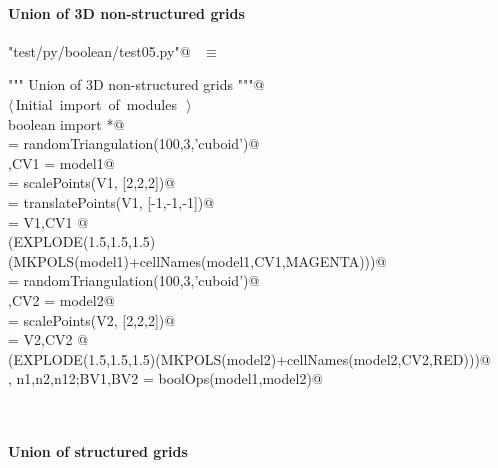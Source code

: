 \documentclass[11pt,oneside]{article}	%
\begin{document}
\paragraph{Union of 3D non-structured grids}

\begin{flushleft} \small
\begin{minipage}{\linewidth} \label{scrap23}
\verb@"test/py/boolean/test05.py"@\nobreak\ {\footnotesize {} }$\equiv$
\vspace{-1ex}
\begin{list}{}{} \item
\mbox{}\verb@""" Union of 3D non-structured grids """@\\
\mbox{}\verb@@\hbox{$\langle\,$Initial import of modules\nobreak\ {\footnotesize {}}$\,\rangle$}\verb@@\\
\mbox{}\verb@from boolean import *@\\
\mbox{} = randomTriangulation(100,3,'cuboid')@\\
\mbox{},CV1 = model1@\\
\mbox{} = scalePoints(V1, [2,2,2])@\\
\mbox{} = translatePoints(V1, [-1,-1,-1])@\\
\mbox{} = V1,CV1 @\\
\mbox{}\verb@VIEW(EXPLODE(1.5,1.5,1.5)(MKPOLS(model1)+cellNames(model1,CV1,MAGENTA)))@\\
\mbox{} = randomTriangulation(100,3,'cuboid')@\\
\mbox{},CV2 = model2@\\
\mbox{} = scalePoints(V2, [2,2,2])@\\
\mbox{} = V2,CV2 @\\
\mbox{}\verb@VIEW(EXPLODE(1.5,1.5,1.5)(MKPOLS(model2)+cellNames(model2,CV2,RED)))@\\
\mbox{}\verb@V, n1,n2,n12;BV1,BV2 = boolOps(model1,model2)@\\
\mbox{}\verb@@{\NWsep}
\end{list}
\vspace{-2ex}
\end{minipage}\\[4ex]
\end{flushleft}


\paragraph{Union of structured grids}
\end{document}
